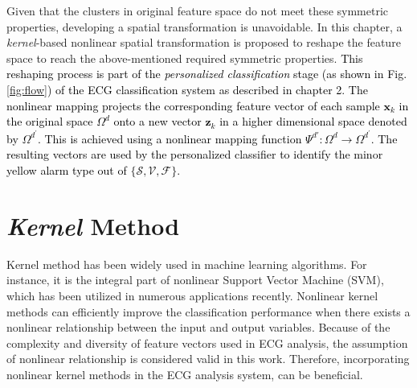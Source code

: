 Given that the clusters in original feature space do not meet these symmetric properties, developing a spatial transformation is unavoidable. In this chapter, a \textit{kernel}-based nonlinear spatial transformation is proposed to reshape the feature space to reach the above-mentioned required symmetric properties. 
\textcolor{black}{This reshaping process is part of the \textcolor{black}{\textit{personalized classification}} stage (as shown in Fig.\ref{fig:flow}) of the ECG classification system as described in chapter 2. The nonlinear mapping projects the corresponding feature vector of each sample $\mathbf{x}_k$  in the original space $\Omega^d$ onto a new vector $\mathbf{z}_k$ in a higher dimensional space denoted by $\Omega^{d^\prime}$.  This is achieved using a nonlinear mapping function $\Psi^{d'}:\Omega^{d} \rightarrow \Omega^{d^\prime}$. The resulting vectors are used by the personalized classifier to identify the minor yellow alarm type out of $\{\mathcal{S},\mathcal{V},\mathcal{F}\}$.} 

  

\section{\textit{Kernel} Method}

Kernel method has been widely used in machine learning algorithms. For instance, it is the integral part of nonlinear Support Vector Machine (SVM), which has been utilized in numerous applications recently\cite{shawe2004kernel}. Nonlinear kernel methods can efficiently improve the classification performance when there exists a nonlinear relationship between the input and output variables. Because of the complexity and diversity of feature vectors used in ECG analysis, the assumption of nonlinear relationship is considered valid in this work. Therefore, incorporating nonlinear kernel methods in the ECG analysis system, can be beneficial.

